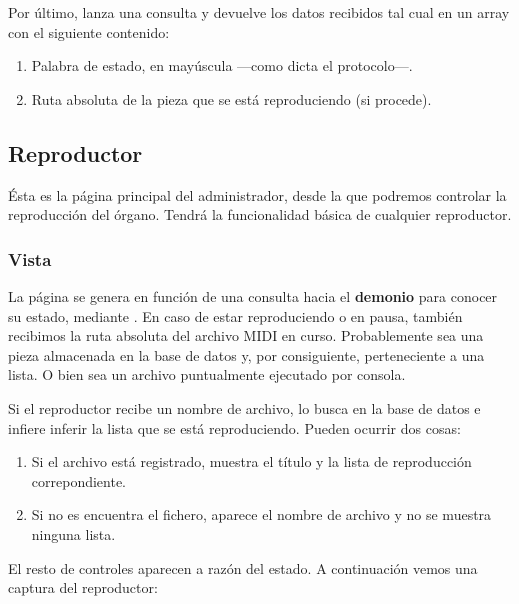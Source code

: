 Por último,  lanza una consulta y devuelve los datos recibidos tal cual en un array con el siguiente contenido:

\begin{enumerate}
	\item Palabra de estado, en mayúscula ---como dicta el protocolo---.
	\item Ruta absoluta de la pieza que se está reproduciendo (si procede).
\end{enumerate}

\subsection{Reproductor}

Ésta es la página principal del administrador, desde la que podremos controlar la reproducción del órgano. Tendrá la funcionalidad básica de cualquier reproductor.

\subsubsection{Vista}

La página se genera en función de una consulta hacia el \textbf{demonio} para conocer su estado, mediante . En caso de estar reproduciendo o en pausa, también recibimos la ruta absoluta del archivo MIDI en curso. Probablemente sea una pieza almacenada en la base de datos y, por consiguiente, perteneciente a una lista. O bien sea un archivo puntualmente ejecutado por consola.

Si el reproductor recibe un nombre de archivo, lo busca en la base de datos e infiere inferir la lista que se está reproduciendo. Pueden ocurrir dos cosas:

\begin{enumerate}
	\item Si el archivo está registrado, muestra el título y la lista de reproducción correpondiente.
	\item Si no es encuentra el fichero, aparece el nombre de archivo y no se muestra ninguna lista.
\end{enumerate}

El resto de controles aparecen a razón del estado. A continuación vemos una captura del reproductor:

\smallskip

